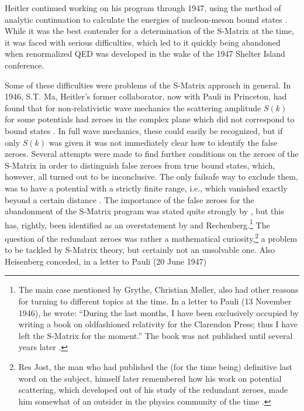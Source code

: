 \documentclass[12pt,a4paper]{article}
\begin{document}
Heitler continued working on his program through 1947, using the method of analytic continuation to calculate the energies of nucleon-meson bound states \citep{heitler_1947_proton}. While it was the best contender for a determination of the S-Matrix at the time, it was faced with serious difficulties, which led to it quickly being abandoned when renormalized QED was developed in the wake of the 1947 Shelter Island conference.

Some of these difficulties were problems of the S-Matrix approach in general. In 1946, S.T. Ma, Heitler's former collaborator, now with Pauli in Princeton, had found that for non-relativistic wave mechanics the scattering amplitude $S(k)$ for some potentials had zeroes in the complex plane which did not correspond to bound states \citep{ma_1946_redundant}. In full wave mechanics, these could easily be recognized, but if only $S(k)$ was given it was not immediately clear how to identify the false zeroes. Several attempts were made to find further conditions on the zeroes of the S-Matrix in order to distinguish false zeroes from true bound states, which, however, all turned out to be inconclusive. The only failsafe way to exclude them, was to have a potential with a strictly finite range, i.e., which vanished exactly beyond a certain distance \citep{jost_1947_uber-die-falschen}. The importance of the false zeroes for the abandonment of the S-Matrix program was stated quite strongly by \citet{grythe_1982_some}, but this has, rightly, been identified as an overstatement by \citet[p. 319]{cushing_1990_theory} and Rechenberg.\footnote{The main case mentioned by Grythe, Christian M\o ller, also had other reasons for turning to different topics at the time. In a letter to Pauli (13 November 1946), he wrote:  ``During the last months, I have been exclusively occupied by writing a book on oldfashioned relativity for the Clarendon Press; thus I have left the S-Matrix for the moment.'' The book was not published until several years later \citep{moller_1952_the-theory}.} The question of the redundant zeroes was rather a mathematical curiosity,\footnote{Res Jost, the man who had published the (for the time being) definitive last word on the subject, himself later remembered how his work on potential scattering, which developed out of his study of the redundant zeroes, made him somewhat of an outsider in the physics community of the time \citep{jost_1984_erinnerungen}.} a problem to be tackled by S-Matrix theory, but certainly not an unsolvable one. Also Heisenberg conceded, in a letter to Pauli (20 June 1947)
\end{document}
